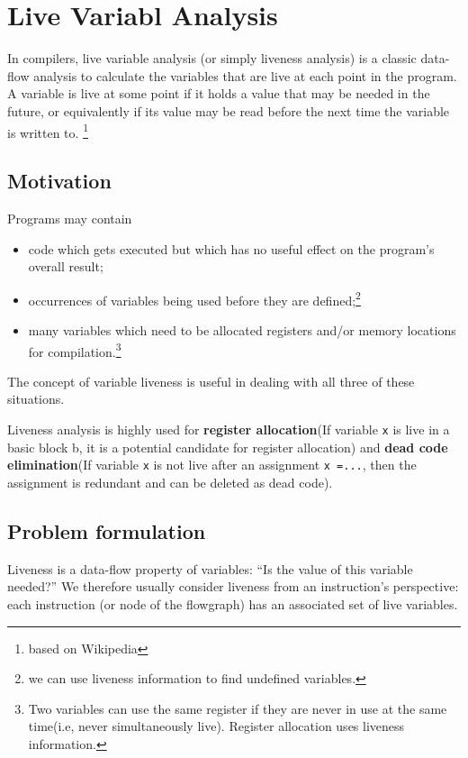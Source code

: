 \newpage
\section{ Live Variabl Analysis   }

In compilers, live variable analysis (or simply liveness analysis)
is a classic data-flow analysis to calculate the variables that
are live at each point in the program. A variable is live at
some point if it holds a value that may be needed in the future,
or equivalently if its value may be read before the next time
the variable is written to. \footnote{based on Wikipedia}

\subsection{Motivation}

Programs may contain

\begin{itemize}
	\item code which gets executed but which has no useful
	      effect on the program's overall result;
	\item occurrences of variables being used before they
	      are defined;\footnote{we can use liveness information to find undefined variables.}
	\item many variables which need to be allocated
	      registers and/or memory locations for compilation.\footnote{Two	variables	can	use	the	same	register	if	they	are	never	in	use	at	the
		      same time(i.e, never	simultaneously live). Register	allocation
		      uses liveness information.}

\end{itemize}

The concept of variable liveness is useful in dealing
with all three of these situations.


Liveness analysis is highly used for \textbf{register allocation}(If variable \texttt{x} is live in a basic block b, it is a potential candidate for
register allocation) and \textbf{dead code elimination}(If variable \texttt{x} is not live after an assignment \texttt{x =...}, then the assignment is
redundant and can be deleted as dead code).


\subsection{Problem formulation}
Liveness is a data-flow property of variables:
“Is the value of this variable needed?” We therefore
usually consider liveness from an instruction's
perspective: each instruction (or node of the
flowgraph) has an associated set of live variables.


